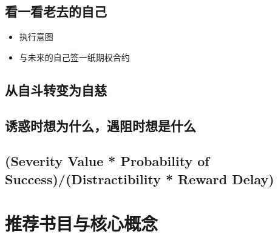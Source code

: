 \documentclass[
  oneside]{book}
\providecommand{\tightlist}{%
  \setlength{\itemsep}{0pt}\setlength{\parskip}{0pt}}
\begin{document}
\hypertarget{ux770bux4e00ux770bux8001ux53bbux7684ux81eaux5df1}{%
\subsection{看一看老去的自己}\label{ux770bux4e00ux770bux8001ux53bbux7684ux81eaux5df1}}

\begin{itemize}
\tightlist
\item
  执行意图
\item
  与未来的自己签一纸期权合约
\end{itemize}

\hypertarget{ux4eceux81eaux6597ux8f6cux53d8ux4e3aux81eaux6148}{%
\subsection{从自斗转变为自慈}\label{ux4eceux81eaux6597ux8f6cux53d8ux4e3aux81eaux6148}}

\hypertarget{ux8bf1ux60d1ux65f6ux60f3ux4e3aux4ec0ux4e48ux9047ux963bux65f6ux60f3ux662fux4ec0ux4e48}{%
\subsection{诱惑时想为什么，遇阻时想是什么}\label{ux8bf1ux60d1ux65f6ux60f3ux4e3aux4ec0ux4e48ux9047ux963bux65f6ux60f3ux662fux4ec0ux4e48}}

\hypertarget{severity-value-probability-of-successdistractibility-reward-delay}{%
\subsection{(Severity Value * Probability of Success)/(Distractibility * Reward Delay)}\label{severity-value-probability-of-successdistractibility-reward-delay}}

\hypertarget{ux63a8ux8350ux4e66ux76eeux4e0eux6838ux5fc3ux6982ux5ff5-2}{%
\section{推荐书目与核心概念}\label{ux63a8ux8350ux4e66ux76eeux4e0eux6838ux5fc3ux6982ux5ff5-2}}

\printbibliography
\end{document}
